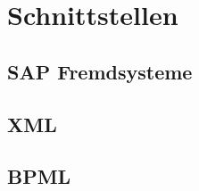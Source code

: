 \section{Schnittstellen}

\subsection{SAP Fremdsysteme}
\label{sec:export-sap}

\subsection{XML}
\label{sec:export-xml}

\subsection{BPML}
\label{sec:export-bpml}
